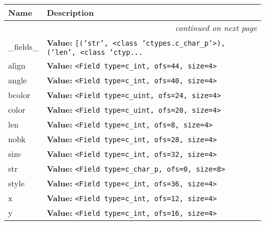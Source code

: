     \vspace{-1cm}
\hspace{\varindent}\begin{longtable}{|p{\varnamewidth}|p{\vardescrwidth}|l}
\cline{1-2}
\cline{1-2} \centering \textbf{Name} & \centering \textbf{Description}& \\
\cline{1-2}
\endhead\cline{1-2}\multicolumn{3}{r}{\small\textit{continued on next page}}\\\endfoot\cline{1-2}
\endlastfoot\raggedright \_\-f\-i\-e\-l\-d\-s\-\_\- & \raggedright \textbf{Value:} 
{\tt \texttt{[}\texttt{(}\texttt{'}\texttt{str}\texttt{'}\texttt{, }{\textless}class 'ctypes.c\_char\_p'{\textgreater}\texttt{)}\texttt{, }\texttt{(}\texttt{'}\texttt{len}\texttt{'}\texttt{, }{\textless}class 'ctyp\texttt{...}}&\\
\cline{1-2}
\raggedright a\-l\-i\-g\-n\- & \raggedright \textbf{Value:} 
{\tt {\textless}Field type=c\_int, ofs=44, size=4{\textgreater}}&\\
\cline{1-2}
\raggedright a\-n\-g\-l\-e\- & \raggedright \textbf{Value:} 
{\tt {\textless}Field type=c\_int, ofs=40, size=4{\textgreater}}&\\
\cline{1-2}
\raggedright b\-c\-o\-l\-o\-r\- & \raggedright \textbf{Value:} 
{\tt {\textless}Field type=c\_uint, ofs=24, size=4{\textgreater}}&\\
\cline{1-2}
\raggedright c\-o\-l\-o\-r\- & \raggedright \textbf{Value:} 
{\tt {\textless}Field type=c\_uint, ofs=20, size=4{\textgreater}}&\\
\cline{1-2}
\raggedright l\-e\-n\- & \raggedright \textbf{Value:} 
{\tt {\textless}Field type=c\_int, ofs=8, size=4{\textgreater}}&\\
\cline{1-2}
\raggedright n\-o\-b\-k\- & \raggedright \textbf{Value:} 
{\tt {\textless}Field type=c\_int, ofs=28, size=4{\textgreater}}&\\
\cline{1-2}
\raggedright s\-i\-z\-e\- & \raggedright \textbf{Value:} 
{\tt {\textless}Field type=c\_int, ofs=32, size=4{\textgreater}}&\\
\cline{1-2}
\raggedright s\-t\-r\- & \raggedright \textbf{Value:} 
{\tt {\textless}Field type=c\_char\_p, ofs=0, size=8{\textgreater}}&\\
\cline{1-2}
\raggedright s\-t\-y\-l\-e\- & \raggedright \textbf{Value:} 
{\tt {\textless}Field type=c\_int, ofs=36, size=4{\textgreater}}&\\
\cline{1-2}
\raggedright x\- & \raggedright \textbf{Value:} 
{\tt {\textless}Field type=c\_int, ofs=12, size=4{\textgreater}}&\\
\cline{1-2}
\raggedright y\- & \raggedright \textbf{Value:} 
{\tt {\textless}Field type=c\_int, ofs=16, size=4{\textgreater}}&\\
\cline{1-2}
\end{longtable}

